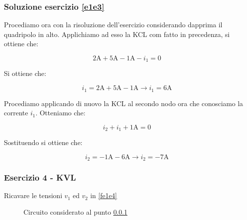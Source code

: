 \documentclass[../main.tex]{subfiles}
\begin{document}
\subsubsection*{Soluzione esercizio \ref{e1e3}}

Procediamo ora con la risoluzione dell'esercizio considerando dapprima il quadripolo in alto. Applichiamo ad esso la KCL com fatto in precedenza, si ottiene che:

\begin{equation}
	\text{2A} + \text{5A} - \text{1A} - i_1 = 0
\end{equation}

Si ottiene che:

\begin{equation}
	i_1 = \text{2A} + \text{5A} - \text{1A} \rightarrow i_1 = \text{6A}
\end{equation}

Procediamo applicando di nuovo la KCL al secondo nodo ora che conosciamo la corrente $i_1$. Otteniamo che:

\begin{equation}
	i_2 + i_1 + \text{1A} = 0
\end{equation}

Sostituendo si ottiene che:

\begin{equation}
	i_2 = - \text{1A} - \text{6A} \rightarrow i_2 = -\text{7A}
\end{equation}

\vspace*{1.5cm}
\subsubsection{Esercizio 4 - KVL}
\label{e1e4}

Ricavare le tensioni $v_1$ ed $v_2$ in \ref{fe1e4}

\begin{figure}[h!]
\begin{center}


	
\end{center}	
\caption{Circuito considerato al punto \ref{e1e4}}
\end{figure}
\label{fe1e4}
\end{document}
